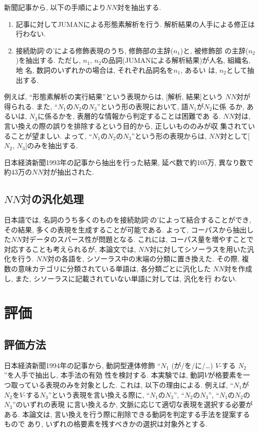 新聞記事から, 以下の手順により$NN対$を抽出する.
\begin{enumerate}
 \item 記事に対してJUMANによる形態素解析を行う. 
       解析結果の人手による修正は行わない.
 \item 接続助詞`の'による修飾表現のうち, 修飾部の主辞($n_1$)と, 被修飾部
       の主辞($n_2$)を抽出する.
       ただし, $n_1$, $n_2$の品詞(JUMANによる解析結果)が人名, 組織名, 地
       名, 数詞のいずれかの場合は, それぞれ品詞名を$n_1$, あるい
       は, $n_2$として抽出する.
\end{enumerate}
例えば, ``形態素解析の実行結果''という表現からは, [解析, 結果]という
$NN対$が得られる.
また, ``$N_1のN_2$の$N_3$''という形の表現において, 語$N_1$が$N_2$に係
るか, あるいは, $N_3$に係るかを, 表層的な情報から判定することは困難であ
る.
$NN対$は, 言い換えの際の誤りを排除するという目的から, 正しいもののみが収
集されていることが望ましい.
よって, ``$N_1のN_2$の$N_3$''という形の表現からは, $NN対$として[$N_2$,
$N_3$]のみを抽出する.

日本経済新聞1993年の記事から抽出を行った結果, 延べ数で約105万, 異なり数で
約43万の$NN対$が抽出された.

\subsection{$NN対$の汎化処理}
日本語では, 名詞のうち多くのものを接続助詞`の'によって結合することができ, 
その結果, 多くの表現を生成することが可能である.
よって, コーパスから抽出した$NN対$データのスパース性が問題となる.
これには, コーパス量を増やすことで対応することも考えられるが, 本論文では,
$NN対$に対してシソーラスを用いた汎化を行う.
$NN対$の各語を, シソーラス\cite{k_ruigo}中の末端の分類に置き換えた.
その際, 複数の意味カテゴリに分類されている単語は, 各分類ごとに汎化した
$NN対$を作成し, また, シソーラスに記載されていない単語に対しては, 汎化を行
わない.

\section{評価}\label{hyouka}
\subsection{評価方法}
日本経済新聞1994年の記事から, 動詞型連体修飾 
``$N_1$ (が/を/に/…) $V$-する $N_2$''を人手で抽出し, 本手法の有効
性を検討する.
本実験では, 動詞$V$が格要素を一つ取っている表現のみを対象とした. 
これは, 以下の理由による.
例えば, ``$N_1$が$N_2$を$V$-する$N_3$''という表現を言い換える際に,
``$N_1$の$N_3$'', ``$N_2$の$N_3$'', ``$N_1$の$N_2$の$N_3$''のいずれの表現
に言い換えるか, 文脈に応じて適切な表現を選択する必要がある.
本論文は, 言い換えを行う際に削除できる動詞を判定する手法を提案するもので
あり, いずれの格要素を残すべきかの選択は対象外とする.

